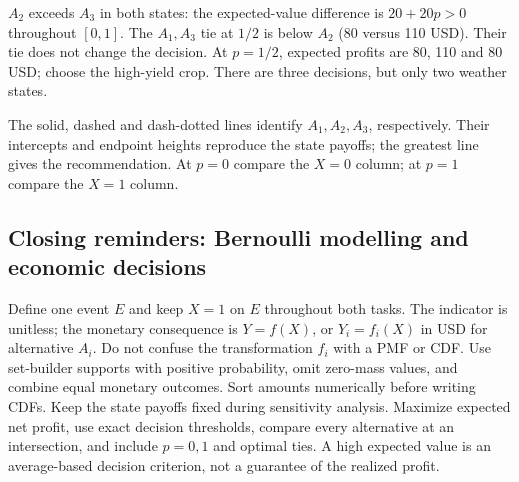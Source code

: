 $A_2$ exceeds $A_3$ in both states: the expected-value difference is $20+20p>0$ throughout $[0,1]$. The $A_1,A_3$ tie at $1/2$ is below $A_2$ (80 versus 110 USD). Their tie does not change the decision. At $p=1/2$, expected profits are 80, 110 and 80 USD; choose the high-yield crop. There are three decisions, but only two weather states.
\begin{center}\end{center}
The solid, dashed and dash-dotted lines identify $A_1,A_2,A_3$, respectively. Their intercepts and endpoint heights reproduce the state payoffs; the greatest line gives the recommendation. At $p=0$ compare the $X=0$ column; at $p=1$ compare the $X=1$ column.

\subsection*{Closing reminders: Bernoulli modelling and economic decisions}
Define one event $E$ and keep $X=1$ on $E$ throughout both tasks. The indicator
is unitless; the monetary consequence is $Y=f(X)$, or $Y_i=f_i(X)$ in USD
for alternative $A_i$. Do not confuse the transformation $f_i$ with a PMF or CDF.
Use set-builder supports with positive probability, omit zero-mass values,
and combine equal monetary outcomes. Sort amounts numerically before writing CDFs.
Keep the state payoffs fixed during sensitivity analysis. Maximize expected
net profit, use exact decision thresholds, compare every alternative at an
intersection, and include $p=0,1$ and optimal ties. A high expected value is an
average-based decision criterion, not a guarantee of the realized profit.



